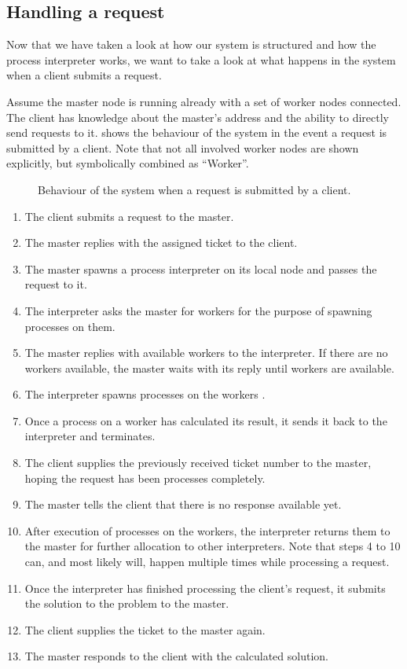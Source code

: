 \subsection{Handling a request}
Now that we have taken a look at how our system is structured and how the process interpreter works, we want to take a look at what happens in the system when a client submits a request.

Assume the master node is running already with a set of worker nodes connected. The client has knowledge about the master's address and the ability to directly send requests to it.  shows the behaviour of the system in the event a request is submitted by a client. Note that not all involved worker nodes are shown explicitly, but symbolically combined as \enquote{Worker}.

\begin{figure}[h!]
  \centering
  
  \caption{Behaviour of the system when a request is submitted by a client.}
  \label{fig:request_handling}
\end{figure}

\begin{enumerate}
  \item The client submits a request to the master.
  \item The master replies with the assigned ticket to the client.
  \item The master spawns a process interpreter on its local node and passes the request to it.
  \item The interpreter asks the master for workers for the purpose of spawning processes on them.
  \item The master replies with available workers to the interpreter. If there are no workers available, the master waits with its reply until workers are available.
  \item The interpreter spawns processes on the workers .
  \item Once a process on a worker has calculated its result, it sends it back to the interpreter and terminates.
  \item The client supplies the previously received ticket number to the master, hoping the request has been processes completely.
  \item The master tells the client that there is no response available yet.
  \item After execution of processes on the workers, the interpreter returns them to the master for further allocation to other interpreters. Note that steps 4 to 10 can, and most likely will, happen multiple times while processing a request.
  \item Once the interpreter has finished processing the client's request, it submits the solution to the problem to the master.
  \item The client supplies the ticket to the master again.
  \item The master responds to the client with the calculated solution.
\end{enumerate}


